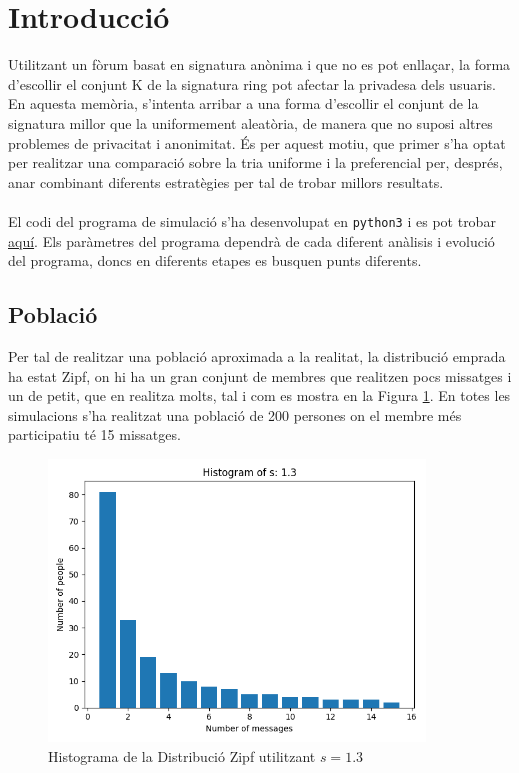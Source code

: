 \documentclass{article}
\begin{document}
\section{Introducció}
Utilitzant un fòrum basat en signatura anònima i que no es pot enllaçar, la forma d’escollir el conjunt K de la signatura
ring pot afectar la privadesa dels usuaris. En aquesta memòria, s'intenta arribar a una forma d'escollir el conjunt de la signatura millor que la uniformement aleatòria, de manera que no suposi altres problemes de privacitat i anonimitat. És per aquest motiu, que primer s'ha optat per realitzar una comparació sobre la tria uniforme i la preferencial per, després, anar combinant diferents estratègies per tal de trobar millors resultats.
\\
\\
El codi del programa de simulació s'ha desenvolupat en \texttt{python3} i es pot trobar \href{https://github.com/sergisi/glowing-dollop}{aquí}. Els paràmetres del programa dependrà de cada diferent anàlisis i evolució del programa, doncs en diferents etapes es busquen punts diferents.
\subsection{Població}
Per tal de realitzar una població aproximada a la realitat, la distribució emprada ha estat Zipf, on hi ha un gran conjunt de membres que realitzen pocs missatges i un de petit, que en realitza molts, tal i com es mostra en la Figura \ref{fig:zipf-s13}. En totes les simulacions s'ha realitzat una població de 200 persones on el membre més participatiu té 15 missatges.
\begin{figure}[H] 
	\centering
	\includegraphics[width=10cm]{imgs/histogram-13.png}
	\caption{Histograma de la Distribució Zipf utilitzant $s=1.3$}
	\label{fig:zipf-s13}
\end{figure}
\end{document}
